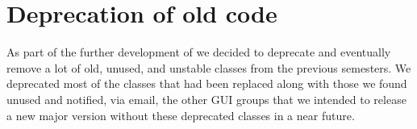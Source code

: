 
\section{Deprecation of old code}
\label{sec:deprecation_of_old_code}

As part of the further development of \gc we decided to deprecate and eventually remove a lot of old, unused, and unstable classes from the previous semesters. We deprecated most of the classes that had been replaced along with those we found unused and notified, via email, the other GUI groups that we intended to release a new major version without these deprecated classes in a near future.  